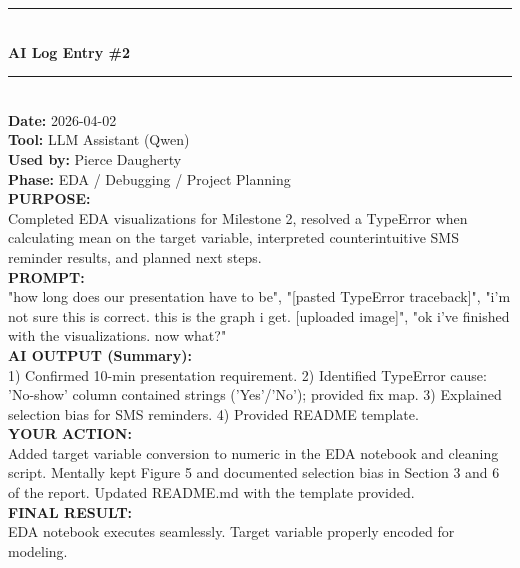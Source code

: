 \documentclass[conference]{IEEEtran}
\begin{document}
\vspace{1em}
\noindent\rule{\columnwidth}{0.4pt} \\
\textbf{AI Log Entry \#2} \\
\noindent\rule{\columnwidth}{0.4pt} \\
\textbf{Date:} 2026-04-02 \\
\textbf{Tool:} LLM Assistant (Qwen) \\
\textbf{Used by:} Pierce Daugherty \\
\textbf{Phase:} EDA / Debugging / Project Planning \\
\textbf{PURPOSE:} \\
Completed EDA visualizations for Milestone 2, resolved a TypeError when calculating mean on the target variable, interpreted counterintuitive SMS reminder results, and planned next steps. \\
\textbf{PROMPT:} \\
"how long does our presentation have to be", "[pasted TypeError traceback]", "i'm not sure this is correct. this is the graph i get. [uploaded image]", "ok i've finished with the visualizations. now what?" \\
\textbf{AI OUTPUT (Summary):} \\
1) Confirmed 10-min presentation requirement. 2) Identified TypeError cause: 'No-show' column contained strings ('Yes'/'No'); provided fix map. 3) Explained selection bias for SMS reminders. 4) Provided README template. \\
\textbf{YOUR ACTION:} \\
Added target variable conversion to numeric in the EDA notebook and cleaning script. Mentally kept Figure 5 and documented selection bias in Section 3 and 6 of the report. Updated README.md with the template provided. \\
\textbf{FINAL RESULT:} \\
EDA notebook executes seamlessly. Target variable properly encoded for modeling.
\end{document}
